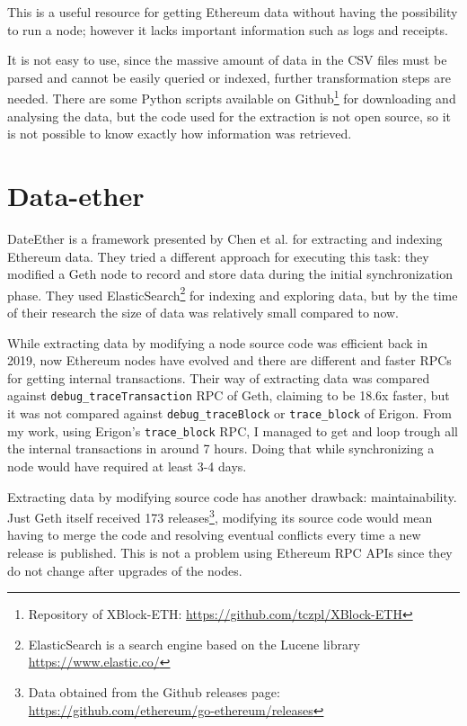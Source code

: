 This is a useful resource for getting Ethereum data without having the possibility to run a node; however it lacks important information such as logs and receipts. 

It is not easy to use, since the massive amount of data in the CSV files must be parsed and cannot be easily queried or indexed, further transformation steps are needed. There are some Python scripts available on Github\footnote{Repository of XBlock-ETH: \url{https://github.com/tczpl/XBlock-ETH}} for downloading and analysing the data, but the code used for the extraction is not open source, so it is not possible to know exactly how information was retrieved.

\section{Data-ether}

DateEther \cite{dataether} is a framework presented by Chen et al. for extracting and indexing Ethereum data. They tried a different approach for executing this task: they modified a Geth node to record and store data during the initial synchronization phase. They used ElasticSearch\footnote{ElasticSearch is a search engine based on the Lucene library \url{https://www.elastic.co/}} for indexing and exploring data, but by the time of their research the size of data was relatively small compared to now.

While extracting data by modifying a node source code was efficient back in 2019, now Ethereum nodes have evolved and there are different and faster RPCs for getting internal transactions. Their way of extracting data was compared against \texttt{debug\_traceTransaction} RPC of Geth, claiming to be 18.6x faster, but it was not compared against \texttt{debug\_traceBlock} or \texttt{trace\_block} of Erigon. From my work, using Erigon's \texttt{trace\_block} RPC, I managed to get and loop trough all the internal transactions in around 7 hours. Doing that while synchronizing a node would have required at least 3-4 days. 

Extracting data by modifying source code has another drawback: maintainability. Just Geth itself received 173 releases\footnote{Data obtained from the Github releases page: \url{https://github.com/ethereum/go-ethereum/releases}}, modifying its source code would mean having to merge the code and resolving eventual conflicts every time a new release is published. This is not a problem using Ethereum RPC APIs since they do not change after upgrades of the nodes.


